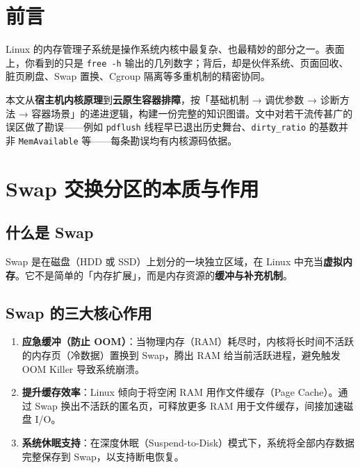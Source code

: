 
\chapter{前言}

Linux 的内存管理子系统是操作系统内核中最复杂、也最精妙的部分之一。表面上，你看到的只是 \texttt{free -h} 输出的几列数字；背后，却是伙伴系统、页面回收、脏页刷盘、Swap 置换、Cgroup 隔离等多重机制的精密协同。

本文从\textbf{宿主机内核原理}到\textbf{云原生容器排障}，按「基础机制 → 调优参数 → 诊断方法 → 容器场景」的递进逻辑，构建一份完整的知识图谱。文中对若干流传甚广的误区做了勘误——例如 \texttt{pdflush} 线程早已退出历史舞台、\texttt{dirty\_ratio} 的基数并非 \texttt{MemAvailable} 等——每条勘误均有内核源码依据。

\chapter{Swap 交换分区的本质与作用}

\section{什么是 Swap}

Swap 是在磁盘（HDD 或 SSD）上划分的一块独立区域，在 Linux 中充当\textbf{虚拟内存}。它不是简单的「内存扩展」，而是内存资源的\textbf{缓冲与补充机制}。

\section{Swap 的三大核心作用}

\begin{enumerate}[leftmargin=2cm]
	\item \textbf{应急缓冲（防止 OOM）}：当物理内存（RAM）耗尽时，内核将长时间不活跃的内存页（冷数据）置换到 Swap，腾出 RAM 给当前活跃进程，避免触发 OOM Killer 导致系统崩溃。
	\item \textbf{提升缓存效率}：Linux 倾向于将空闲 RAM 用作文件缓存（Page Cache）。通过 Swap 换出不活跃的匿名页，可释放更多 RAM 用于文件缓存，间接加速磁盘 I/O。
	\item \textbf{系统休眠支持}：在深度休眠（Suspend-to-Disk）模式下，系统将全部内存数据完整保存到 Swap，以支持断电恢复。
\end{enumerate}

